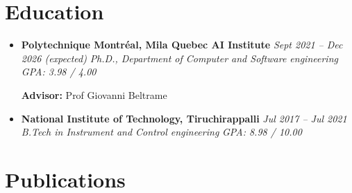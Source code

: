 \documentclass[letterpaper,10pt]{article}
\newenvironment{cvitemize}{
    \begin{itemize}[leftmargin=10pt,label={},afterlabel={},after=\vspace{-12pt}]
}{
    \end{itemize}
}
\newcommand{\eduitem}[5]{
    \item{
        \textbf{#1} \hfill \textit{#2} \newline
        \textit{#3} \hfill \textit{#4} \newline
        #5
    }
}
\newcommand{\highlight}{\raisebox{0.1\height}{$\bigstar$}\hspace{4pt}}
\begin{document}
\section*{Education}
\begin{cvitemize}
    \eduitem{Polytechnique Montréal, Mila Quebec AI Institute}{Sept 2021 -- Dec 2026 (expected)}{Ph.D., Department of Computer and Software engineering}{GPA: 3.98 / 4.00}{
        \textbf{Advisor:} Prof Giovanni Beltrame 
    }

    \eduitem{National Institute of Technology, Tiruchirappalli}{Jul 2017 -- Jul 2021}{B.Tech in Instrument and Control engineering}{GPA: 8.98 / 10.00}{}

\end{cvitemize}


\section*{Publications}
\end{document}
